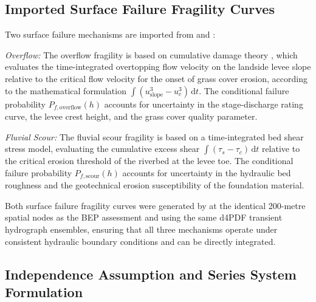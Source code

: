 \subsection{Imported Surface Failure Fragility Curves}
\label{subsec: Imported Surface Failure Fragility Curves}

Two surface failure mechanisms are imported from \textcite{uemura_phd_2025} and \textcite{uemura_wp2_2024}:

\textit{Overflow:} The overflow fragility is based on cumulative damage theory \parencite{dean_2010}, which evaluates the time-integrated overtopping flow velocity on the landside levee slope relative to the critical flow velocity for the onset of grass cover erosion, according to the mathematical formulation $\int (u_{\text{slope}}^3 - u_c^3)\,\mathrm{d}t$. The conditional failure probability $P_{f,\mathrm{overflow}}(h)$ accounts for uncertainty in the stage-discharge rating curve, the levee crest height, and the grass cover quality parameter.

\textit{Fluvial Scour:} The fluvial scour fragility is based on a time-integrated bed shear stress model, evaluating the cumulative excess shear $\int (\tau_s - \tau_c)\,\mathrm{d}t$ relative to the critical erosion threshold of the riverbed at the levee toe. The conditional failure probability $P_{f,\mathrm{scour}}(h)$ accounts for uncertainty in the hydraulic bed roughness and the geotechnical erosion susceptibility of the foundation material.

Both surface failure fragility curves were generated by \textcite{uemura_phd_2025} at the identical 200-metre spatial nodes as the BEP assessment and using the same d4PDF transient hydrograph ensembles, ensuring that all three mechanisms operate under consistent hydraulic boundary conditions and can be directly integrated.

\subsection{Independence Assumption and Series System Formulation}
\label{subsec: Independence Assumption and Series System Formulation}

